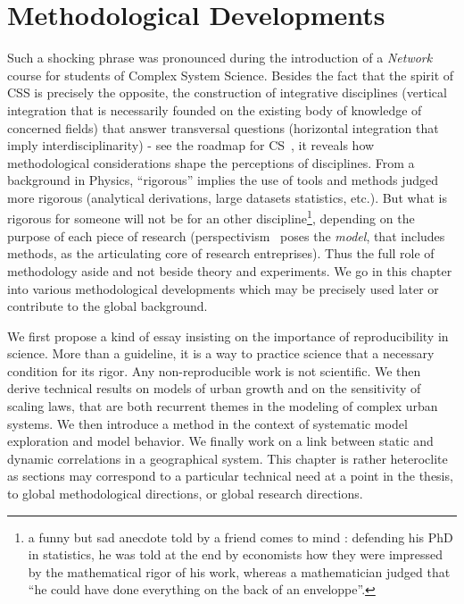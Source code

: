 



\chapter{Methodological Developments} %

\label{ch:methodology} %



\bigskip

Such a shocking phrase was pronounced during the introduction of a \emph{Network} course for students of Complex System Science. Besides the fact that the spirit of CSS is precisely the opposite, {\ie} the construction of integrative disciplines (vertical integration that is necessarily founded on the existing body of knowledge of concerned fields) that answer transversal questions (horizontal integration that imply interdisciplinarity) - see {\eg} the roadmap for CS~\cite{2009arXiv0907.2221B}, it reveals how methodological considerations shape the perceptions of disciplines. From a background in Physics, ``rigorous'' implies the use of tools and methods judged more rigorous (analytical derivations, large datasets statistics, etc.). But what is rigorous for someone will not be for an other discipline\footnote{a funny but sad anecdote told by a friend comes to mind : defending his PhD in statistics, he was told at the end by economists how they were impressed by the mathematical rigor of his work, whereas a mathematician judged that ``he could have done everything on the back of an enveloppe''.}, depending on the purpose of each piece of research (perspectivism~\cite{giere2010scientific} poses the \emph{model}, that includes methods, as the articulating core of research entreprises). Thus the full role of methodology aside and not beside theory and experiments. We go in this chapter into various methodological developments which may be precisely used later or contribute to the global background.

We first propose a kind of essay insisting on the importance of reproducibility in science. More than a guideline, it is a way to practice science that a necessary condition for its rigor. Any non-reproducible work is not scientific. We then derive technical results on models of urban growth and on the sensitivity of scaling laws, that are both recurrent themes in the modeling of complex urban systems. We then introduce a method in the context of systematic model exploration and model behavior. We finally work on a link between static and dynamic correlations in a geographical system. This chapter is rather heteroclite as sections may correspond to a particular technical need at a point in the thesis, to global methodological directions, or global research directions.



